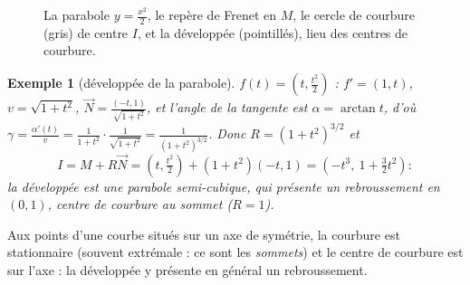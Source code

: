 \documentclass[a4paper,11pt]{article}
\numberwithin{equation}{section}
\numberwithin{figure}{section}
\numberwithin{table}{section}
\theoremstyle{enonce}
\theoremstyle{exemple}
\newtheorem{exemple}[definition]{Exemple}
\theoremstyle{remarque}
\newcommand{\ve}[1]{\vec{#1}}
\begin{document}
\begin{figure}[H]
\centering
{}
\caption{La parabole $y=\frac{x^2}2$, le repère de Frenet en $M$, le cercle de courbure (gris) de centre $I$, et la développée
(pointillés), lieu des centres de courbure.}\label{fig:frenet}
\end{figure}

\begin{exemple}[développée de la parabole]
$f(t)=\left(t,\frac{t^2}2\right)$ : $f'=(1,t)$, $v=\sqrt{1+t^2}$, $\ve N=\frac{(-t,1)}{\sqrt{1+t^2}}$, et
l'angle de la tangente est $\alpha=\arctan t$, d'où $\gamma=\frac{\alpha'(t)}{v}=\frac{1}{1+t^2}\cdot\frac1{\sqrt{1+t^2}}=\frac1{(1+t^2)^{3/2}}$. Donc $R=(1+t^2)^{3/2}$ et
\[I=M+R\ve N=\left(t,\tfrac{t^2}2\right)+(1+t^2)(-t,1)=\left(-t^3,\ 1+\tfrac32t^2\right) :\]
la développée est une parabole semi-cubique, qui présente un rebroussement en $(0,1)$, centre de courbure au sommet ($R=1$).
\end{exemple}

\begin{reflexe}
Aux points d'une courbe situés sur un axe de symétrie, la courbure est stationnaire (souvent extrémale : ce sont les
\emph{sommets}) et le centre de courbure est sur l'axe : la développée y présente en général un rebroussement.
\end{reflexe}
\end{document}
